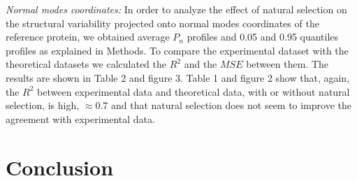 \documentclass{article}
\begin{document}
{\it Normal modes coordinates:}
In order to analyze the effect of natural selection on the structural variability projected onto normal modes coordinates of the reference protein, we obtained average $P_{n}$ profiles and 0.05 and 0.95 quantiles profiles as explained in Methods. To compare the experimental dataset with the theoretical datasets we calculated the $R^2$ and the $MSE$ between them. The results are shown in Table 2 and figure 3. Table 1 and figure 2 show that, again, the $R^2$ between experimental data and theoretical data, with or without natural selection, is high, $\approx 0.7$ and that natural selection does not seem to improve the agreement with experimental data. 


\section{Conclusion}
\end{document}
